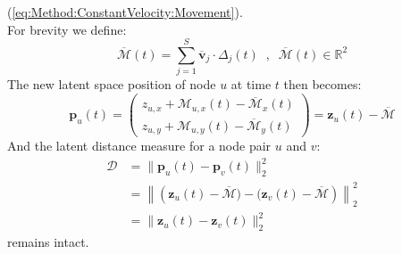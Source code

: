 (\ref{eq:Method:ConstantVelocity:Movement}).
\\
For brevity we define:
\begin{equation}
    \overline{\mathcal{M}}(t) = \sum_{j=1}^S \overline{\textbf{v}}_j \cdot \Delta_{j}(t) \;\;,\;\; \overline{\mathcal{M}}(t) \in \mathbb{R}^{2}
\end{equation}
The new latent space position of node $u$ at time $t$ then becomes:
\begin{equation}
    \textbf{p}_u(t) = 
     \begin{pmatrix}
        z_{u,x} + \mathcal{M}_{u,x}(t) - \overline{\mathcal{M}}_{x}(t) \\
        z_{u,y}+ \mathcal{M}_{u,y}(t) - \overline{\mathcal{M}}_{y}(t)
    \end{pmatrix} =
    \textbf{z}_u(t) - \overline{\mathcal{M}}
\end{equation}
And the latent distance measure for a node pair $u$ and $v$:
\begin{align}
     \mathcal{D} &= \rVert \textbf{p}_u(t) - \textbf{p}_v(t) \rVert_2^2 \\
     &= \left\rVert \left(\textbf{z}_u(t)-\overline{\mathcal{M}}) - (\textbf{z}_v(t)-\overline{\mathcal{M}}\right) \right\rVert_2^2 \\
     &= \rVert \textbf{z}_u(t) - \textbf{z}_v(t) \rVert_2^2 
\end{align}
remains intact.

